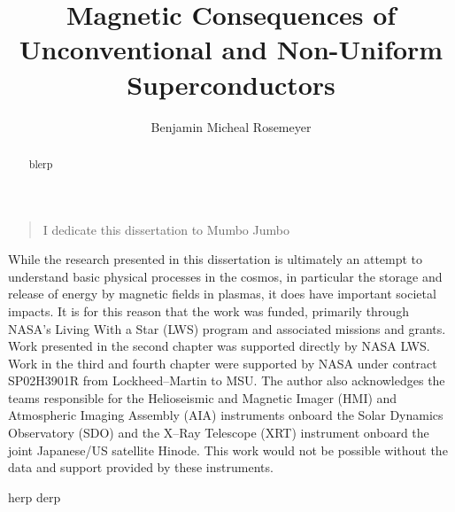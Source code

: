 \documentclass[final,dissertation]{msudoc}
\title{Magnetic Consequences of Unconventional and Non-Uniform Superconductors}
\author{Benjamin Micheal Rosemeyer}
\begin{document}
\frontmatter
\maketitlepage
\makecopyrightpage
\makeapprovalpage
\makepermissionpage

\begin{dedication}
  \begin{verse}
    I dedicate this dissertation to Mumbo Jumbo
  \end{verse}
\end{dedication}

\begin{preface}
  While the research presented in this dissertation is ultimately an attempt to understand basic physical processes in the cosmos, in particular the storage and release of energy by magnetic fields in plasmas, it does have important societal impacts.  It is for this reason that the work was funded, primarily through NASA's Living With a Star (LWS) program and associated missions and grants.  Work presented in the second chapter was supported directly by NASA LWS.  Work in the third and fourth chapter were supported by NASA under contract SP02H3901R from Lockheed--Martin to MSU.  The author also acknowledges the teams responsible for the Helioseismic and Magnetic Imager (HMI) and Atmospheric Imaging Assembly (AIA) instruments onboard the Solar Dynamics Observatory (SDO) and the X--Ray Telescope (XRT) instrument onboard the joint Japanese/US satellite Hinode.  This work would not be possible without the data and support provided by these instruments.
\end{preface}

\begin{acknowledgements}

  herp derp

\end{acknowledgements}

\maketableofcontents
\makelistoftables
\makelistoffigures

\begin{abstract}
  
  blerp
  
\end{abstract}

\mainmatter




\backmatter



{
  \singlespace
}

\end{document}
